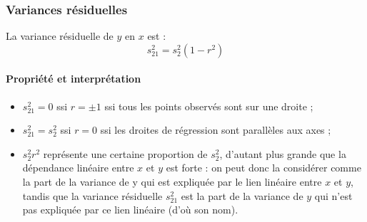 \newpage
\subsubsection{Variances résiduelles}
La variance résiduelle de $y$ en $x$ est :
$$\boxed{s_{21}^2 = s_2^2 (1-r^2)}$$
\paragraph{Propriété et interprétation}
\begin{itemize}
	\item $s_{21}^2 = 0$ ssi $r = \pm1$ ssi tous les points observés sont sur une droite ;
	\item $s_{21}^2 = s_2^2$ ssi $r = 0$ ssi les droites de régression sont parallèles aux axes ;
	\item $s_2^2r^2$ représente une certaine proportion de $s_2^2$, d’autant plus grande que la dépendance linéaire entre $x$ et $y$ est forte : on peut donc la considérer comme la part de la variance de y qui est expliquée par le lien linéaire entre $x$ et $y$, tandis que la variance résiduelle $s_{21}^2$ est la part de la variance de $y$ qui n’est pas expliquée par ce lien linéaire (d’où son nom).
\end{itemize}
